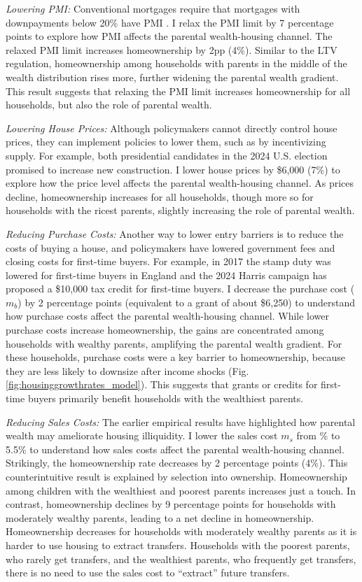 \documentclass[12pt]{article}
\begin{document}
\textit{Lowering PMI:} Conventional mortgages require that mortgages with downpayments below 20\% have PMI \cite{goodman2017sixty}. I relax the PMI limit by 7 percentage points to explore how PMI affects the parental wealth-housing channel. The relaxed PMI limit increases homeownership by 2pp (4\%). Similar to the LTV regulation, homeownership among households with  parents in the middle of the wealth distribution rises more, further widening the parental wealth gradient. This result suggests that relaxing the PMI limit increases homeownership for all households, but also the role of parental wealth.

\textit{Lowering House Prices:} Although policymakers cannot directly control house prices, they can implement policies to lower them, such as by incentivizing supply. For example, both presidential candidates in the 2024 U.S. election promised to increase new construction. I lower house prices by \$6,000 (7\%) to explore how the price level affects the parental wealth-housing channel.  As prices decline, homeownership increases for all households, though more so for households with the ricest parents, slightly increasing the role of parental wealth.

\textit{Reducing Purchase Costs:} Another way to lower entry barriers is to reduce the costs of buying a house, and policymakers have lowered government fees and closing costs for first-time buyers. For example, in 2017 the stamp duty was lowered for first-time buyers in England and the 2024 Harris campaign has proposed a \$10,000 tax credit for first-time buyers. I decrease the purchase cost ($m_b$) by 2 percentage points (equivalent to a grant of about \$6,250) to understand how purchase costs affect the parental wealth-housing channel. While lower purchase costs increase homeownership, the gains are concentrated among households with wealthy parents, amplifying the parental wealth gradient. For these households, purchase costs were a key barrier to homeownership, because they are less likely to downsize after income shocks (Fig. \ref{fig:housinggrowthrates_model}). This suggests that grants or credits for first-time buyers primarily benefit households with the wealthiest parents.

\textit{Reducing Sales Costs:} The earlier empirical results have highlighted how parental wealth may ameliorate housing illiquidity. I lower the sales cost $m_s$ from \parms\% to 5.5\% to understand how sales costs affect the parental wealth-housing channel. Strikingly, the homeownership rate decreases by 2 percentage points (4\%). This counterintuitive  result is explained by selection into ownership. Homeownership among children with the wealthiest and poorest parents increases just a touch. In contrast, homeownership declines by 9 percentage points for households with moderately wealthy parents, leading to a net decline in homeownership. Homeownership decreases for households with moderately wealthy parents as it is harder to use housing to extract transfers. Households with the poorest parents, who rarely get transfers, and the wealthiest parents, who frequently get transfers, there is no need to use the sales cost to ``extract'' future transfers.
\end{document}
